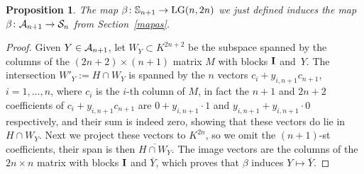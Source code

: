 \documentclass[pdftex]{sigma}
\newcommand{\bS}{{\mathbb S}}
\newcommand{\cA}{{\cal A}}
\newcommand{\cS}{{\cal S}}
\numberwithin{equation}{section}
\newtheorem{Proposition}[Theorem]{Proposition}
{ \theoremstyle{definition}
\newtheorem{Definition}[Theorem]{Definition}
\newtheorem{Example}[Theorem]{Example}
\newtheorem{Examples}[Theorem]{Examples}
\newtheorem{Remark}[Theorem]{Remark} }
\begin{document}
\begin{Proposition} \label{betas} The map $\beta\colon \bS_{n+1}\rightarrow {\rm LG}(n,2n)$ we just defined induces the map $\beta\colon \cA_{n+1}\rightarrow\cS_n$ from Section~{\rm \ref{mapas}}.
\end{Proposition}

\begin{proof}  Given $Y\in \cA_{n+1}$, let $W_Y\subset K^{2n+2}$ be the subspace spanned by the columns of the $(2n+2)\times(n+1)$ matrix $M$ with blocks ${\bf I}$ and~$Y$. The intersection $W'_Y:=H\cap W_Y$ is spanned by the $n$ vectors $c_i+y_{i,n+1}c_{n+1}$, $i=1,\ldots,n$, where $c_i$ is the $i$-th column of $M$, in fact the $n+1$ and $2n+2$ coefficients of $c_i+y_{i,n+1}c_{n+1}$ are $0+y_{i,n+1}\cdot1$ and $y_{i,n+1}+y_{i,n+1}\cdot 0$ respectively, and their sum is indeed zero, showing that these vectors do lie in $H\cap W_Y$. Next we project these vectors to $K^{2n}$, so we omit the $(n+1)$-st coefficients, their span is then $\overline{H\cap W_Y}$. The image vectors are the columns of the $2n\times n$ matrix with blocks ${\bf I}$ and $\overline{Y}$, which proves that $\beta$ induces $Y\mapsto\overline{Y}$.\end{proof}
\end{document}
